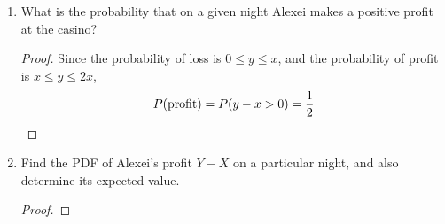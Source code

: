 \documentclass[paper=usletter, fontsize=12pt]{article}
\begin{document}
\begin{enumerate}
\begin{enumerate}
\begin{proof}
                Therefore,
                \begin{align*}
                    f_{X,Y}(x,y) & =\frac{f_{Y \mid X}(y \mid x)}{f_X(x)}\\
                    & =
                    \begin{dcases}
                        \frac{ax}{2x}, & \text{ if } 0 \le x \le 40, \ 0 \le y \le 2x,\\
                        0, & \text{otherwise}
                    \end{dcases} \\
                    & =
                    \begin{dcases}
                        \frac{a}{2}, & \text{ if } 0 \le x \le 40, \ 0 \le y \le 2x,\\
                        0, & \text{otherwise}
                    \end{dcases} \\
                    & =
                    \begin{dcases}
                        \frac{1}{1600}, & \text{ if } 0 \le x \le 40, \ 0 \le y \le 2x,\\
                        0, & \text{otherwise}
                    \end{dcases} \qedhere
                \end{align*}

            \end{proof}

            \item What is the probability that on a given night Alexei makes a
            positive profit at the casino?
            \begin{proof}

                Since the probability of loss is $0 \le y \le x$, and the
                probability of profit is $x \le y \le 2x$,
                \begin{equation*}
                    P(\text{profit}) = P(y-x>0)=\frac{1}{2} \qedhere
                \end{equation*}

            \end{proof}

            \item Find the PDF of Alexei's profit $Y-X$ on a particular night,
            and also determine its expected value.
            \begin{proof}


\end{proof}
\end{enumerate}
\end{enumerate}
\end{document}
